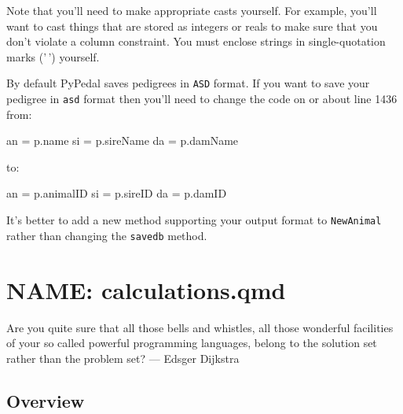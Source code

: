\documentclass[
  letterpaper,
  DIV=11,
  numbers=noendperiod]{scrreprt}
\newenvironment{Shaded}{\begin{snugshade}}{\end{snugshade}}
\newcommand{\NormalTok}[1]{\textcolor[rgb]{0.00,0.23,0.31}{#1}}
\newcommand{\OperatorTok}[1]{\textcolor[rgb]{0.37,0.37,0.37}{#1}}
\begin{document}
Note that you'll need to make appropriate casts yourself. For example,
you'll want to cast things that are stored as integers or reals to make
sure that you don't violate a column constraint. You must enclose
strings in single-quotation marks ('\,') yourself.

By default PyPedal saves pedigrees in \texttt{ASD} format. If you want
to save your pedigree in \texttt{asd} format then you'll need to change
the code on or about line 1436 from:

\begin{Shaded}
\begin{Highlighting}[]
\NormalTok{an }\OperatorTok{=}\NormalTok{ p.name}
\NormalTok{si }\OperatorTok{=}\NormalTok{ p.sireName}
\NormalTok{da }\OperatorTok{=}\NormalTok{ p.damName}
\end{Highlighting}
\end{Shaded}

to:

\begin{Shaded}
\begin{Highlighting}[]
\NormalTok{an }\OperatorTok{=}\NormalTok{ p.animalID}
\NormalTok{si }\OperatorTok{=}\NormalTok{ p.sireID}
\NormalTok{da }\OperatorTok{=}\NormalTok{ p.damID}
\end{Highlighting}
\end{Shaded}

It's better to add a new method supporting your output format to
\texttt{NewAnimal} rather than changing the \texttt{savedb} method.


\chapter{NAME: calculations.qmd}\label{name-calculations.qmd}

\begin{tcolorbox}[enhanced jigsaw, colframe=quarto-callout-tip-color-frame, bottomrule=.15mm, toprule=.15mm, colback=white, left=2mm, breakable, rightrule=.15mm, leftrule=.75mm, opacityback=0, arc=.35mm]

Are you quite sure that all those bells and whistles, all those
wonderful facilities of your so called powerful programming languages,
belong to the solution set rather than the problem set? --- Edsger
Dijkstra

\end{tcolorbox}

\section{Overview}\label{sec-computing-overview}
\end{document}
